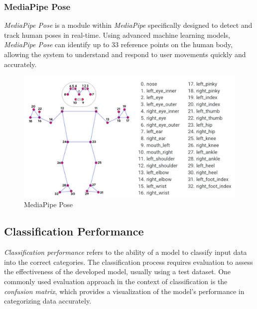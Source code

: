 \subsubsection{MediaPipe Pose}
\label{subsubsec:MediaPipe Pose}

\emph{MediaPipe Pose} is a module within \emph{MediaPipe} specifically designed to detect and track human poses in real-time. Using advanced machine learning models, \emph{MediaPipe Pose} can identify up to 33 reference points on the human body, allowing the system to understand and respond to user movements quickly and accurately.

\begin{figure}[H]
  \centering
  \includegraphics[scale=0.5]{gambar/mp_pose.jpg}
  \caption{MediaPipe Pose}
  \label{fig:mp_pose}
\end{figure}

\subsection{Classification Performance}
\label{subsec:Classification Performance}

\emph{Classification performance} refers to the ability of a model to classify input data into the correct categories. The classification process requires evaluation to assess the effectiveness of the developed model, usually using a test dataset. One commonly used evaluation approach in the context of classification is the \emph{confusion matrix}, which provides a visualization of the model's performance in categorizing data accurately.

